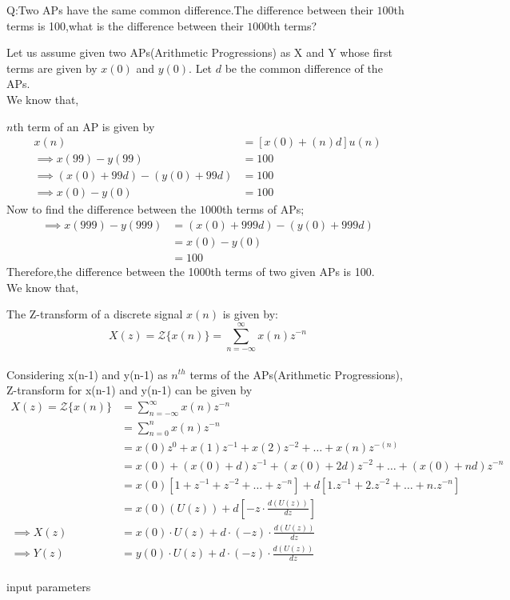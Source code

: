 \documentclass[journal,12pt,onecolumn]{IEEEtran}
\theoremstyle{remark}
\begin{document}
\let\vec\mathbf







\bigskip

\renewcommand{\thefigure}{\theenumi}
\renewcommand{\thetable}{\theenumi}

Q:Two APs have the same common difference.The difference between their $100${th} terms is 100,what is the difference between their $1000${th} terms?

\solution

Let us assume given two APs(Arithmetic Progressions) as X and Y whose first terms are given by $x(0)$ and $y(0)$. Let $d$ be the common difference of the APs. 
\\
We know that, 

$n$th term of an AP is given by 
\begin{align}
x(n) &= [x(0)+(n)d]u(n) \\
\implies x(99) - y(99) &= 100 \\
\implies (x(0) + 99d) - (y(0) + 99d) &= 100
 \\
\implies x(0) - y(0) &= 100
\end{align}
Now to find the difference between the $1000$th terms of APs;
\begin{align}
\implies x(999) - y(999) &= (x(0) + 999d) - (y(0) + 999d)
\\
&= x(0) - y(0)\\
&= 100  
\end{align}
Therefore,the difference between the 1000th terms of two given APs is 100.\\

We know that,

The Z-transform of a discrete signal $x(n)$ is given by:
\[ X(z) = \mathcal{Z}\{x(n)\} = \sum_{n=-\infty}^{\infty} x(n)z^{-n} \]
\\ Considering x(n-1) and y(n-1) as $n^{th}$ terms of the APs(Arithmetic Progressions), Z-transform for x(n-1) and y(n-1) can be given by
\begin{align}
X(z) = \mathcal{Z}\{x(n)\} 
&= \sum_{n=-\infty}^{\infty} x(n)z^{-n} \\
&=\sum_{n=0}^{n}x(n)z^{-n} \\
&=x(0)z^{0}+x(1)z^{-1}+x(2)z^{-2}+ \ldots +x(n)z^{-(n)} \\
&=x(0)+(x(0)+d)z^{-1}+(x(0)+2d)z^{-2}+ \ldots +(x(0)+nd)z^{-n} \\
&=x(0)[1+ z^{-1} + z^{-2} + \ldots + z^{-n}] + d[1.z^{-1}+2.z^{-2}+\ldots+n.z^{-n}] \\
&=x(0)(U(z)) + d[-z \cdot \frac {d(U(z))}{dz}] \\
\implies X(z) &= x(0)\cdot U(z) + d\cdot{(-z)} \cdot \frac {d(U(z))}{dz}   \\
\implies Y(z) &= y(0)\cdot U(z) + d\cdot{(-z)} \cdot \frac {d(U(z))}{dz}  \\
\end{align}
\begin{table}[!ht]
    \centering
    
    
    \caption{input parameters}
    \label{tab:10_5_3_12}
\end{table}
\end{document}
